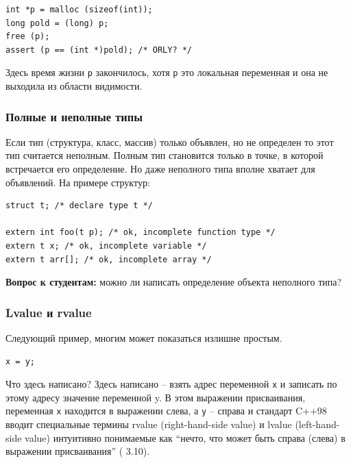 \documentclass[a4paper,12pt,oneside]{article}
\newif\ifanswers
\begin{document}
\begin{lstlisting}
int *p = malloc (sizeof(int));
long pold = (long) p;
free (p);
assert (p == (int *)pold); /* ORLY? */
\end{lstlisting}

Здесь время жизни \lstinline!p! закончилось, хотя \lstinline!p! это локальная переменная и она не выходила из области видимости.

\subsubsection{Полные и неполные типы}

Если тип (структура, класс, массив) только объявлен, но не определен то этот тип считается неполным. Полным тип становится только в точке, в которой встречается его определение. Но даже неполного типа вполне хватает для объявлений. На примере структур:

\begin{lstlisting}
struct t; /* declare type t */

extern int foo(t p); /* ok, incomplete function type */
extern t x; /* ok, incomplete variable */
extern t arr[]; /* ok, incomplete array */
\end{lstlisting}

\textbf{Вопрос к студентам:} можно ли написать определение объекта неполного типа?

\ifanswers
Правильный ответ: конечно нет, так как неизвестно сколько памяти надо такому объекту. Но можно написать определение указателя на такой объект.
\fi

\subsubsection{Lvalue и rvalue}\label{LRvalues}

Следующий пример, многим может показаться излишне простым.

\begin{lstlisting}
x = y;
\end{lstlisting}

Что здесь написано? Здесь написано – взять адрес переменной \lstinline!x! и записать по этому адресу значение переменной y. В этом выражении присваивания, переменная \lstinline!x! находится в выражении слева, а \lstinline!y! -- справа и стандарт C++98 вводит специальные термины rvalue (right-hand-side value) и lvalue (left-hand-side value) интуитивно понимаемые как ``нечто, что может быть справа (слева) в выражении присваивания'' (\cite{stdcpp98} 3.10). 
\end{document}
